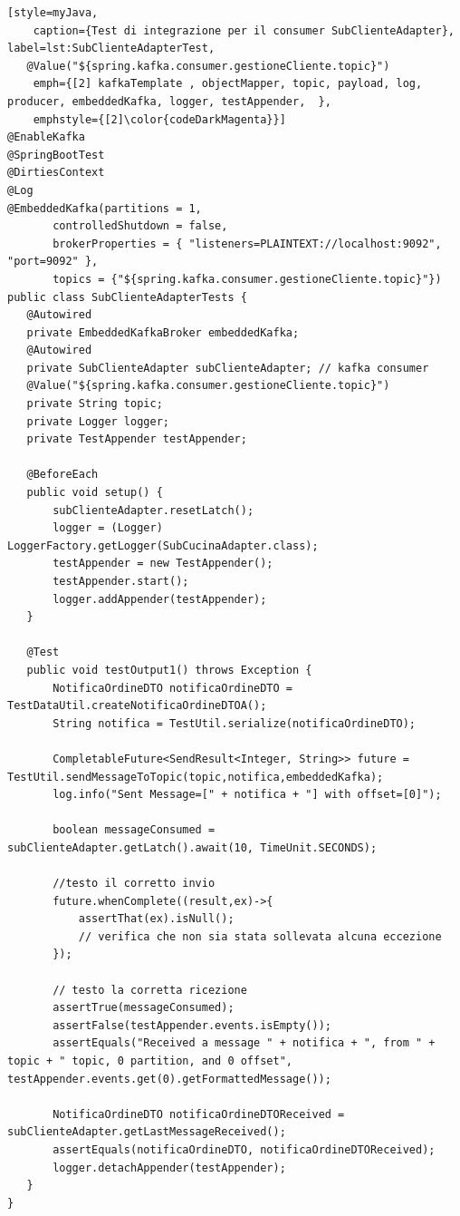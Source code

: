 \begin{lstlisting}[style=myJava, 
    caption={Test di integrazione per il consumer SubClienteAdapter}, label=lst:SubClienteAdapterTest, 
   @Value("${spring.kafka.consumer.gestioneCliente.topic}")
    emph={[2] kafkaTemplate , objectMapper, topic, payload, log, producer, embeddedKafka, logger, testAppender,  },
    emphstyle={[2]\color{codeDarkMagenta}}]
@EnableKafka
@SpringBootTest
@DirtiesContext
@Log
@EmbeddedKafka(partitions = 1,
       controlledShutdown = false,
       brokerProperties = { "listeners=PLAINTEXT://localhost:9092", "port=9092" },
       topics = {"${spring.kafka.consumer.gestioneCliente.topic}"})
public class SubClienteAdapterTests {
   @Autowired
   private EmbeddedKafkaBroker embeddedKafka;
   @Autowired
   private SubClienteAdapter subClienteAdapter; // kafka consumer
   @Value("${spring.kafka.consumer.gestioneCliente.topic}")
   private String topic;
   private Logger logger;
   private TestAppender testAppender;

   @BeforeEach
   public void setup() {
       subClienteAdapter.resetLatch();
       logger = (Logger) LoggerFactory.getLogger(SubCucinaAdapter.class);
       testAppender = new TestAppender();
       testAppender.start();
       logger.addAppender(testAppender);
   }

   @Test
   public void testOutput1() throws Exception {
       NotificaOrdineDTO notificaOrdineDTO = TestDataUtil.createNotificaOrdineDTOA();
       String notifica = TestUtil.serialize(notificaOrdineDTO);

       CompletableFuture<SendResult<Integer, String>> future = TestUtil.sendMessageToTopic(topic,notifica,embeddedKafka);
       log.info("Sent Message=[" + notifica + "] with offset=[0]");

       boolean messageConsumed = subClienteAdapter.getLatch().await(10, TimeUnit.SECONDS);

       //testo il corretto invio
       future.whenComplete((result,ex)->{
           assertThat(ex).isNull(); 
           // verifica che non sia stata sollevata alcuna eccezione
       });

       // testo la corretta ricezione
       assertTrue(messageConsumed);
       assertFalse(testAppender.events.isEmpty());
       assertEquals("Received a message " + notifica + ", from " + topic + " topic, 0 partition, and 0 offset", testAppender.events.get(0).getFormattedMessage());

       NotificaOrdineDTO notificaOrdineDTOReceived = subClienteAdapter.getLastMessageReceived();
       assertEquals(notificaOrdineDTO, notificaOrdineDTOReceived);
       logger.detachAppender(testAppender);
   }
}
\end{lstlisting}
